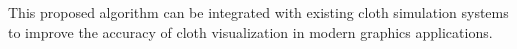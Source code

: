 This proposed algorithm can be integrated with existing cloth simulation systems to improve the accuracy of cloth visualization in modern graphics applications.
	


\thispagestyle{empty}
%
